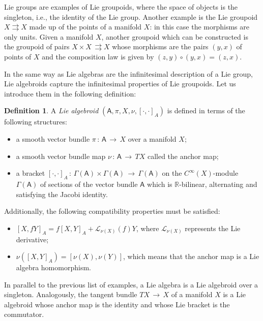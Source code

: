 \documentclass[12pt,a4paper]{article}
\numberwithin{equation}{section}
\theoremstyle{definition}
\newtheorem{definition}[equation]{Definition}
\newcommand{\sfA}{\mathsf{A}}
\begin{document}
Lie groups are examples of Lie groupoids, where the space of objects is the singleton, i.e., the identity of the Lie group. Another example is the Lie groupoid $X\rightrightarrows X$ made up of the points of a manifold $X$: in this case the morphisms are only units. Given a manifold $X$, another groupoid which can be constructed is the groupoid of pairs $X\times X\,\rightrightarrows X$ whose morphisms are the pairs $(y,x)$ of points of $X$ and the composition law is given by $(z,y)\circ (y,x) = (z,x)$.

In the same way as Lie algebras are the infinitesimal description of a Lie group, Lie algebroids capture the infinitesimal properties of Lie groupoids. Let us introduce them in the following definition:

\begin{definition}\label{def.algebroid}
A {\it Lie algebroid} $(\sfA, \pi, X, \nu, [\cdot,\cdot]_A)$ is defined in terms of  the following structures:
\begin{itemize}
\item a smooth vector bundle $\pi\,\colon\,\sfA\,\rightarrow\,X$ over a manifold $X$;
\item a smooth vector bundle map $\nu\,\colon\,\sfA\,\rightarrow\,TX$ called the anchor map;
\item a bracket $[\cdot,\cdot]_A\,\colon\,\Gamma(\sfA)\times \Gamma(\sfA)\,\rightarrow\,\Gamma(\sfA)$ on the $C^{\infty}(X)$-module $\Gamma(\sfA)$ of sections of the vector bundle $\sfA$ which is $\mathbb{R}$-bilinear, alternating and satisfying the Jacobi identity. 
\end{itemize}   
Additionally, the following compatibility properties must be satisfied:
\begin{itemize}
\item $[X,fY]_A= f[X,Y]_A + \mathcal{L}_{\nu(X)}(f) Y$, where $\mathcal{L}_{\nu(X)}$ represents the Lie derivative;
\item $\nu([X,Y]_A) = [\nu(X),\nu(Y)]$, which means that the anchor map is a Lie algebra homomorphism. 
\end{itemize}
\end{definition}

In parallel to the previous list of examples, a Lie algebra is a Lie algebroid over a singleton. Analogously, the tangent bundle $TX\,\rightarrow\,X$ of a manifold $X$ is a Lie algebroid whose anchor map is the identity and whose Lie bracket is the commutator. 
\end{document}
